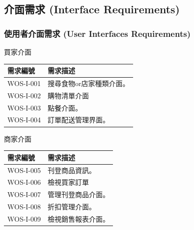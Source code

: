 \documentclass[a4paper, 12pt]{article}
\begin{document}
\subsection{介面需求 (Interface Requirements)}
\subsubsection{使用者介面需求 (User Interfaces Requirements)}
\setlength{\parindent}{2em} 買家介面
\begin{center}
\noindent\begin{tabular}{ | p{6.5em} | p{32em} |}
    \hline
    需求編號 & 需求描述 \\ 
    \hline
    WOS-I-001 & 搜尋食物or店家種類介面。\\
    \hline
    WOS-I-002 & 購物清單介面\\
    \hline
    WOS-I-003 & 點餐介面。\\
    \hline
    WOS-I-004 & 訂單配送管理界面。\\
    \hline
    \end{tabular}
\end{center}

\setlength{\parindent}{2em} 商家介面
\begin{center}
\noindent\begin{tabular}{ | p{6.5em} | p{32em} |}
    \hline
    需求編號 & 需求描述 \\ 
    \hline
    WOS-I-005 & 刊登商品資訊。\\
    \hline
    WOS-I-006 & 檢視買家訂單\\
    \hline
    WOS-I-007 & 管理刊登商品介面。\\
    \hline
    WOS-I-008 & 折扣管理介面。\\
    \hline
    WOS-I-009 & 檢視銷售報表介面。\\
    \hline
    \end{tabular}
\end{center}
    
\end{document}
